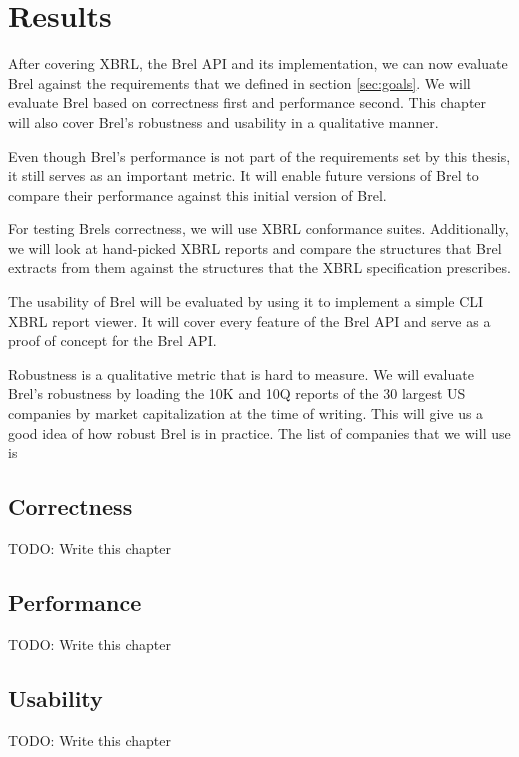 \chapter{Results}
\label{chapter:results}

After covering XBRL, the Brel API and its implementation, we can now evaluate Brel against the requirements that we defined in section \ref{sec:goals}.
We will evaluate Brel based on correctness first and performance second.
This chapter will also cover Brel's robustness and usability in a qualitative manner.

Even though Brel's performance is not part of the requirements set by this thesis,
it still serves as an important metric.
It will enable future versions of Brel to compare their performance against this initial version of Brel.

For testing Brels correctness, we will use XBRL conformance suites.
Additionally, we will look at hand-picked XBRL reports and compare the structures that Brel extracts from them against the structures that the XBRL specification prescribes.

The usability of Brel will be evaluated by using it to implement a simple CLI XBRL report viewer.
It will cover every feature of the Brel API and serve as a proof of concept for the Brel API.

Robustness is a qualitative metric that is hard to measure.
We will evaluate Brel's robustness by loading the 10K and 10Q reports of the 30 largest US companies by market capitalization at the time of writing.
This will give us a good idea of how robust Brel is in practice.
The list of companies that we will use is

\section{Correctness}

TODO: Write this chapter

\section{Performance}

TODO: Write this chapter

\section{Usability}

TODO: Write this chapter

